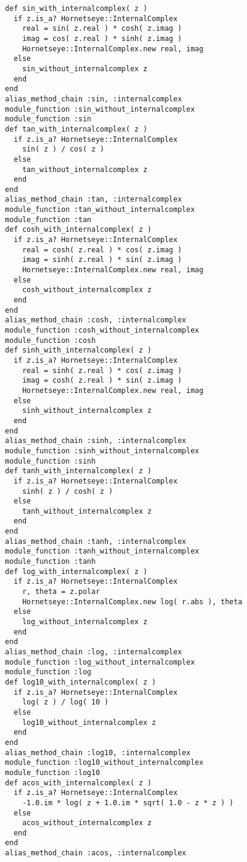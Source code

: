 \begin{lstlisting}
  def sin_with_internalcomplex( z )
    if z.is_a? Hornetseye::InternalComplex
      real = sin( z.real ) * cosh( z.imag )
      imag = cos( z.real ) * sinh( z.imag )
      Hornetseye::InternalComplex.new real, imag
    else
      sin_without_internalcomplex z
    end
  end
  alias_method_chain :sin, :internalcomplex
  module_function :sin_without_internalcomplex
  module_function :sin
  def tan_with_internalcomplex( z )
    if z.is_a? Hornetseye::InternalComplex
      sin( z ) / cos( z )
    else
      tan_without_internalcomplex z
    end
  end
  alias_method_chain :tan, :internalcomplex
  module_function :tan_without_internalcomplex
  module_function :tan
  def cosh_with_internalcomplex( z )
    if z.is_a? Hornetseye::InternalComplex
      real = cosh( z.real ) * cos( z.imag )
      imag = sinh( z.real ) * sin( z.imag )
      Hornetseye::InternalComplex.new real, imag
    else
      cosh_without_internalcomplex z
    end
  end
  alias_method_chain :cosh, :internalcomplex
  module_function :cosh_without_internalcomplex
  module_function :cosh
  def sinh_with_internalcomplex( z )
    if z.is_a? Hornetseye::InternalComplex
      real = sinh( z.real ) * cos( z.imag )
      imag = cosh( z.real ) * sin( z.imag )
      Hornetseye::InternalComplex.new real, imag
    else
      sinh_without_internalcomplex z
    end
  end
  alias_method_chain :sinh, :internalcomplex
  module_function :sinh_without_internalcomplex
  module_function :sinh
  def tanh_with_internalcomplex( z )
    if z.is_a? Hornetseye::InternalComplex
      sinh( z ) / cosh( z )
    else
      tanh_without_internalcomplex z
    end
  end
  alias_method_chain :tanh, :internalcomplex
  module_function :tanh_without_internalcomplex
  module_function :tanh
  def log_with_internalcomplex( z )
    if z.is_a? Hornetseye::InternalComplex
      r, theta = z.polar
      Hornetseye::InternalComplex.new log( r.abs ), theta
    else
      log_without_internalcomplex z
    end
  end
  alias_method_chain :log, :internalcomplex
  module_function :log_without_internalcomplex
  module_function :log
  def log10_with_internalcomplex( z )
    if z.is_a? Hornetseye::InternalComplex
      log( z ) / log( 10 )
    else
      log10_without_internalcomplex z
    end
  end
  alias_method_chain :log10, :internalcomplex
  module_function :log10_without_internalcomplex
  module_function :log10
  def acos_with_internalcomplex( z )
    if z.is_a? Hornetseye::InternalComplex
      -1.0.im * log( z + 1.0.im * sqrt( 1.0 - z * z ) )
    else
      acos_without_internalcomplex z
    end
  end
  alias_method_chain :acos, :internalcomplex

\end{lstlisting}
